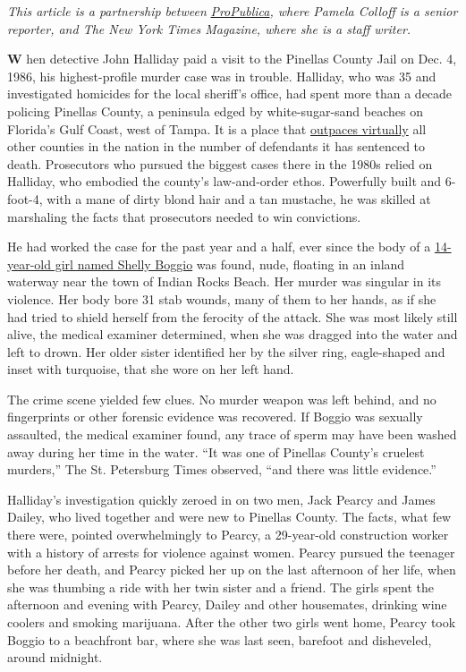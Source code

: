 \emph{This article is a partnership between}
\href{https://www.propublica.org/article/hes-a-liar-a-con-artist-and-a-snitch-his-testimony-could-soon-send-a-man-to-his-death}{\emph{ProPublica}}\emph{,
where Pamela Colloff is a senior reporter, and The New York Times
Magazine, where she is a staff writer.}

\textbf{W} hen detective John Halliday paid a visit to the Pinellas
County Jail on Dec. 4, 1986, his highest-profile murder case was in
trouble. Halliday, who was 35 and investigated homicides for the local
sheriff's office, had spent more than a decade policing Pinellas County,
a peninsula edged by white-sugar-sand beaches on Florida's Gulf Coast,
west of Tampa. It is a place that
\href{http://fairpunishment.org/wp-content/uploads/2016/12/FPP-TooBroken_II.pdf}{outpaces
virtually} all other counties in the nation in the number of defendants
it has sentenced to death. Prosecutors who pursued the biggest cases
there in the 1980s relied on Halliday, who embodied the county's
law-and-order ethos. Powerfully built and 6-foot-4, with a mane of dirty
blond hair and a tan mustache, he was skilled at marshaling the facts
that prosecutors needed to win convictions.

He had worked the case for the past year and a half, ever since the body
of a
\href{https://www.newspapers.com/clip/27881593/tampa_bay_times/}{14-year-old
girl named Shelly Boggio} was found, nude, floating in an inland
waterway near the town of Indian Rocks Beach. Her murder was singular in
its violence. Her body bore 31 stab wounds, many of them to her hands,
as if she had tried to shield herself from the ferocity of the attack.
She was most likely still alive, the medical examiner determined, when
she was dragged into the water and left to drown. Her older sister
identified her by the silver ring, eagle-shaped and inset with
turquoise, that she wore on her left hand.

The crime scene yielded few clues. No murder weapon was left behind, and
no fingerprints or other forensic evidence was recovered. If Boggio was
sexually assaulted, the medical examiner found, any trace of sperm may
have been washed away during her time in the water. ``It was one of
Pinellas County's cruelest murders,'' The St. Petersburg Times observed,
``and there was little evidence.''

Halliday's investigation quickly zeroed in on two men, Jack Pearcy and
James Dailey, who lived together and were new to Pinellas County. The
facts, what few there were, pointed overwhelmingly to Pearcy, a
29-year-old construction worker with a history of arrests for violence
against women. Pearcy pursued the teenager before her death, and Pearcy
picked her up on the last afternoon of her life, when she was thumbing a
ride with her twin sister and a friend. The girls spent the afternoon
and evening with Pearcy, Dailey and other housemates, drinking wine
coolers and smoking marijuana. After the other two girls went home,
Pearcy took Boggio to a beachfront bar, where she was last seen,
barefoot and disheveled, around midnight.

